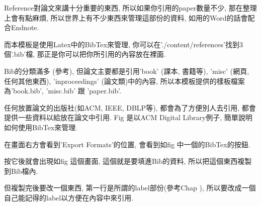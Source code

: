 

Reference對論文來講十分重要的東西, 所以如果你引用的paper數量不少, 那在整理上會有點麻煩, 所以世界上有不少東西來管理這部份的資料, 如用的Word的話會配合Endnote.

而本模板是使用Latex中的BibTex來管理, 你可以在'./content/references'找到3個'.bib'檔, 那正是你可以把你所引用的內容放在裡面.

Bib的分類滿多 (參考), 但論文主要都是引用'book' (課本, 書籍等), 'misc' (網頁, 任何其他東西), 'inproceedings' (論文類)中的內容, 所以本模板提供的樣板檔案為'book.bib', 'misc.bib' 跟 'paper.bib'.


任何放置論文的出版社(如ACM, IEEE, DBLP等), 都會為了方便別人去引用, 都會提供一些資料以給放在論文中引用. Fig  是以ACM Digital Library例子, 簡單說明如何使用BibTex來管理.



在畫面右方會看到'Export Formats'的位置, 會看到如fig 中一個的BibTex的按鈕.


按它後就會出現如fig 這個畫面, 這個就是要填進Bib的資料, 所以把這個東西複製到Bib檔內.


但複製完後要改一個東西, 第一行是所謂的label部份(參考Chap ), 所以要改成一個自己能記得的label以方便在內容中來引用.


\EndChapter
